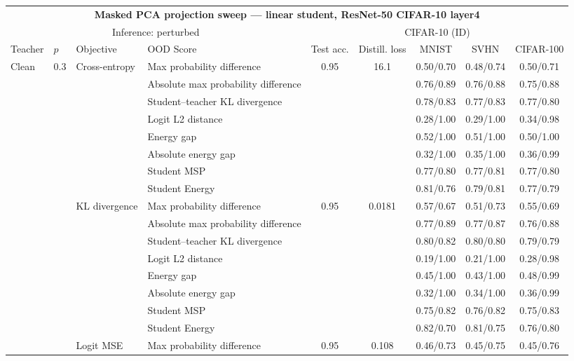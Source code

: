 \documentclass[border=2pt]{standalone}
\begin{document}
\scriptsize
\setlength{\tabcolsep}{4pt}
\begin{tabular}{llllccccc}
\multicolumn{9}{c}{\textbf{Masked PCA projection sweep --- linear student, ResNet-50 CIFAR-10 layer4}}\\[4pt]
\multicolumn{4}{c}{Inference: perturbed} & \multicolumn{5}{c}{CIFAR-10 (ID)} \\
\cmidrule(lr){5-9}
\toprule
Teacher & $p$ & Objective & OOD Score & Test acc. & Distill. loss & MNIST & SVHN & CIFAR-100 \\
\midrule
Clean & 0.3 & Cross-entropy & Max probability difference & 0.95 & 16.1 & 0.50/0.70 & 0.48/0.74 & 0.50/0.71 \\
 &  &  & Absolute max probability difference &  &  & 0.76/0.89 & 0.76/0.88 & 0.75/0.88 \\
 &  &  & Student--teacher KL divergence &  &  & 0.78/0.83 & 0.77/0.83 & 0.77/0.80 \\
 &  &  & Logit L2 distance &  &  & 0.28/1.00 & 0.29/1.00 & 0.34/0.98 \\
 &  &  & Energy gap &  &  & 0.52/1.00 & 0.51/1.00 & 0.50/1.00 \\
 &  &  & Absolute energy gap &  &  & 0.32/1.00 & 0.35/1.00 & 0.36/0.99 \\
 &  &  & Student MSP &  &  & 0.77/0.80 & 0.77/0.81 & 0.77/0.80 \\
 &  &  & Student Energy &  &  & 0.81/0.76 & 0.79/0.81 & 0.77/0.79 \\
\addlinespace
 &  & KL divergence & Max probability difference & 0.95 & 0.0181 & 0.57/0.67 & 0.51/0.73 & 0.55/0.69 \\
 &  &  & Absolute max probability difference &  &  & 0.77/0.89 & 0.77/0.87 & 0.76/0.88 \\
 &  &  & Student--teacher KL divergence &  &  & 0.80/0.82 & 0.80/0.80 & 0.79/0.79 \\
 &  &  & Logit L2 distance &  &  & 0.19/1.00 & 0.21/1.00 & 0.28/0.98 \\
 &  &  & Energy gap &  &  & 0.45/1.00 & 0.43/1.00 & 0.48/0.99 \\
 &  &  & Absolute energy gap &  &  & 0.32/1.00 & 0.34/1.00 & 0.36/0.99 \\
 &  &  & Student MSP &  &  & 0.75/0.82 & 0.76/0.82 & 0.75/0.83 \\
 &  &  & Student Energy &  &  & 0.82/0.70 & 0.81/0.75 & 0.76/0.80 \\
\addlinespace
 &  & Logit MSE & Max probability difference & 0.95 & 0.108 & 0.46/0.73 & 0.45/0.75 & 0.45/0.76 \\

\end{tabular}
\end{document}
